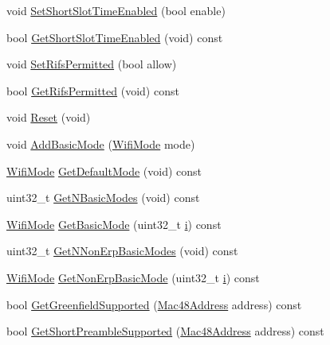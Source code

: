 \begin{DoxyCompactItemize}
\item 
void \hyperlink{classns3_1_1WifiRemoteStationManager_a127fb3ed96ad66f647c1fa3dc616e274}{Set\+Short\+Slot\+Time\+Enabled} (bool enable)
\item 
bool \hyperlink{classns3_1_1WifiRemoteStationManager_abbcfcdce410a9673dbdf18a9d7614f8c}{Get\+Short\+Slot\+Time\+Enabled} (void) const 
\item 
void \hyperlink{classns3_1_1WifiRemoteStationManager_a61a25c7485e65131a0ebba3993d6744a}{Set\+Rifs\+Permitted} (bool allow)
\item 
bool \hyperlink{classns3_1_1WifiRemoteStationManager_a19e2cd8b8c0a6d39ec014a27c2f817f2}{Get\+Rifs\+Permitted} (void) const 
\item 
void \hyperlink{classns3_1_1WifiRemoteStationManager_aced390304611226a99f37dcfefd45f33}{Reset} (void)
\item 
void \hyperlink{classns3_1_1WifiRemoteStationManager_a169339a6312b10580cb6a940228833f0}{Add\+Basic\+Mode} (\hyperlink{classns3_1_1WifiMode}{Wifi\+Mode} mode)
\item 
\hyperlink{classns3_1_1WifiMode}{Wifi\+Mode} \hyperlink{classns3_1_1WifiRemoteStationManager_a54cc63cdbc8067b7f737be74a9e0081c}{Get\+Default\+Mode} (void) const 
\item 
uint32\+\_\+t \hyperlink{classns3_1_1WifiRemoteStationManager_a1528f837dd70f82cda248f1434b94357}{Get\+N\+Basic\+Modes} (void) const 
\item 
\hyperlink{classns3_1_1WifiMode}{Wifi\+Mode} \hyperlink{classns3_1_1WifiRemoteStationManager_a8e4599eafc71fa98f6869e3d8908ea24}{Get\+Basic\+Mode} (uint32\+\_\+t \hyperlink{lte__uplink__power__control_8m_a6f6ccfcf58b31cb6412107d9d5281426}{i}) const 
\item 
uint32\+\_\+t \hyperlink{classns3_1_1WifiRemoteStationManager_a7c372d1189c95a4c3869330c48a8ab68}{Get\+N\+Non\+Erp\+Basic\+Modes} (void) const 
\item 
\hyperlink{classns3_1_1WifiMode}{Wifi\+Mode} \hyperlink{classns3_1_1WifiRemoteStationManager_a5abe0fd036dbd5d3a435898f753faa77}{Get\+Non\+Erp\+Basic\+Mode} (uint32\+\_\+t \hyperlink{lte__uplink__power__control_8m_a6f6ccfcf58b31cb6412107d9d5281426}{i}) const 
\item 
bool \hyperlink{classns3_1_1WifiRemoteStationManager_ad7e8b1cf473b5ce4a593d6dff8e038d1}{Get\+Greenfield\+Supported} (\hyperlink{classns3_1_1Mac48Address}{Mac48\+Address} address) const 
\item 
bool \hyperlink{classns3_1_1WifiRemoteStationManager_a75da15b749baf80b44aa5435d2747d9e}{Get\+Short\+Preamble\+Supported} (\hyperlink{classns3_1_1Mac48Address}{Mac48\+Address} address) const 

\end{DoxyCompactItemize}
